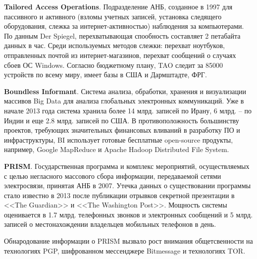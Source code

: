 	\textbf{Tailored Access Operations}. Подразделение АНБ, созданное в 1997 для пассивного и активного (взломы учетных записей, установка следящего оборудования, слежка за интернет-активностью) наблюдения за компьютерами. По данным Der Spiegel, перехватывающая спообность составляет 2 петабайта данных в час. %
	Среди используемых методов слежки: перехват ноутбуков, отправленных почтой из интернет-магазинов, перехват сообщений о случаях сбоев ОС Windows. Согласно бюджетному плану, TAO следит за 85000 устройств по всему миру, имеет базы в США и Дармштадте, ФРГ. 
	
	\textbf{Boundless Informant}. Система анализа, обработки, хранения и визуализации массивов Big Data для анализа глобальных электронных коммуникаций.  Уже в начале 2013 года система хранила более 14 млрд. записей по Ирану, 6 млрд. --  по Индии и еще 2.8 млрд. записей по США. %
	В противоположность большинству проектов, требующих значительных финансовых вливаний в разработку ПО и инфраструктуры, BI использует готовые бесплатные open-source продукты, например, Google MapReduce и  Apache Hadoop Distributed File System.
	
	\textbf{PRISM}.  Государственная программа и 	комплекс мероприятий, осуществляемых с целью  негласного массового  сбора информации, передаваемой   сетями электросвязи, принятая АНБ в 2007. Утечка данных о существовании программы стало известно в 2013 после публикации отрывков секретной презентации в   <<The Guardian>> и <<The Washington Post>>. Мощность системы оценивается в 1.7 млрд. телефонных звонков и электронных сообщений и 5 млрд. записей о местонахождении владельцев мобильных телефонов в день.  %
	
	Обнародование информации о PRISM вызвало рост внимания общетсвенности на технологиях PGP, шифрованном мессенджере   Bitmessage и технологиях TOR. %
	
